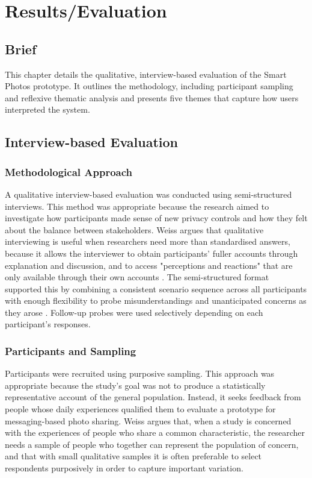 \chapter{Results/Evaluation}

\section{Brief}
This chapter details the qualitative, interview-based evaluation of the Smart Photos prototype. It outlines the methodology, including participant sampling and reflexive thematic analysis and presents five themes that capture how users interpreted the system.

\section{Interview-based Evaluation}

\subsection{Methodological Approach}

A qualitative interview-based evaluation was conducted using semi-structured interviews. This method was appropriate because the research aimed to investigate how participants made sense of new privacy controls and how they felt about the balance between stakeholders. Weiss argues that qualitative interviewing is useful when researchers need more than standardised answers, because it allows the interviewer to obtain participants' fuller accounts through explanation and discussion, and to access "perceptions and reactions" that are only available through their own accounts \cite{weiss_1994}. The semi-structured format supported this by combining a consistent scenario sequence across all participants with enough flexibility to probe misunderstandings and unanticipated concerns as they arose \cite{weiss_1994}. Follow-up probes were used selectively depending on each participant's responses.

\subsection{Participants and Sampling}
Participants were recruited using purposive sampling. This approach was appropriate because the study's goal was not to produce a statistically representative account of the general population. Instead, it seeks feedback from people whose daily experiences qualified them to evaluate a prototype for messaging-based photo sharing. Weiss argues that, when a study is concerned with the experiences of people who share a common characteristic, the researcher needs a sample of people who together can represent the population of concern, and that with small qualitative samples it is often preferable to select respondents purposively in order to capture important variation\cite{weiss_1994}.

